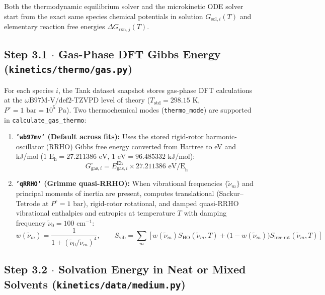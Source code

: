 \documentclass[11pt,a4paper]{article}
\begin{document}
Both the thermodynamic equilibrium solver and the microkinetic ODE solver start from the exact same species chemical potentials in solution $G_{\text{sol}, i}(T)$ and elementary reaction free energies $\Delta G_{\text{rxn}, j}(T)$.

\subsection*{Step 3.1 $\cdot$ Gas-Phase DFT Gibbs Energy (\texttt{kinetics/\allowbreak{}thermo/\allowbreak{}gas.py})}

For each species $i$, the Tank dataset snapshot stores gas-phase DFT calculations at the \textbf{$\omega\text{B97M-V/def2-TZVPD}$} level of theory ($T_{\text{std}} = 298.15\text{ K}$, $P^\circ = 1\text{ bar} = 10^5\text{ Pa}$). Two thermochemical modes (\texttt{thermo\_\allowbreak{}mode}) are supported in \texttt{calculate\_\allowbreak{}gas\_\allowbreak{}thermo}:

\begin{enumerate}[leftmargin=1.8em]
    \item \textbf{\texttt{'wb97mv'} (Default across fits):} Uses the stored rigid-rotor harmonic-oscillator (RRHO) Gibbs free energy converted from Hartree to eV and kJ/mol ($1\text{ E}_{\text{h}} = 27.211386\text{ eV}$, $1\text{ eV} = 96.485332\text{ kJ/mol}$):
    \begin{equation}
    G_{\text{gas}, i}^\circ = E_{\text{gas}, i}^{\text{Eh}} \times 27.211386\text{ eV/E}_{\text{h}}
    \end{equation}
    \item \textbf{\texttt{'qRRHO'} (Grimme quasi-RRHO):} When vibrational frequencies $\{\tilde{\nu}_m\}$ and principal moments of inertia are present, computes translational (Sackur--Tetrode at $P^\circ = 1\text{ bar}$), rigid-rotor rotational, and damped quasi-RRHO vibrational enthalpies and entropies at temperature $T$ with damping frequency $\tilde{\nu}_0 = 100\text{ cm}^{-1}$:
    \begin{equation}
    w(\tilde{\nu}_m) = \frac{1}{1 + (\tilde{\nu}_0 / \tilde{\nu}_m)^4}, \qquad S_{\text{vib}} = \sum_m \left[ w(\tilde{\nu}_m) S_{\text{HO}}(\tilde{\nu}_m, T) + \big(1 - w(\tilde{\nu}_m)\big) S_{\text{free-rot}}(\tilde{\nu}_m, T) \right]
    \end{equation}
\end{enumerate}

\subsection*{Step 3.2 $\cdot$ Solvation Energy in Neat or Mixed Solvents (\texttt{kinetics/\allowbreak{}data/\allowbreak{}medium.py})}
\end{document}
